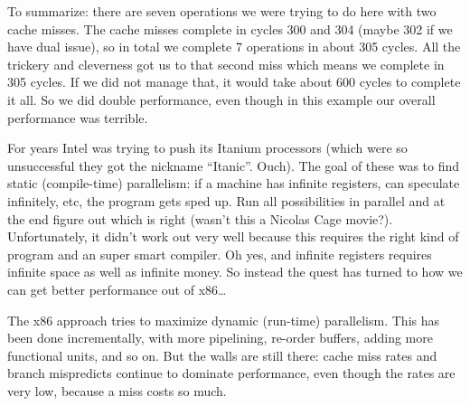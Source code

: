 
To summarize: there are seven operations we were trying to do here with two cache misses. The cache misses complete in cycles 300 and 304 (maybe 302 if we have dual issue), so in total we complete 7 operations in about 305 cycles. All the trickery and cleverness got us to that second miss which means we complete in 305 cycles. If we did not manage that, it would take about 600 cycles to complete it all. So we did double performance, even though in this example our overall performance was terrible.
 
For years Intel was trying to push its Itanium processors (which were so unsuccessful they got the nickname ``Itanic''. Ouch). The goal of these was to find static (compile-time) parallelism: if a machine has infinite registers, can speculate infinitely, etc, the program gets sped up. Run all possibilities in parallel and at the end figure out which is right (wasn't this a Nicolas Cage movie?). Unfortunately, it didn't work out very well because this requires the right kind of program and an super smart compiler. Oh yes, and infinite registers requires infinite space as well as infinite money. So instead the quest has turned to how we can get better performance out of x86\ldots

The x86 approach tries to maximize dynamic (run-time) parallelism. This has been done incrementally, with more pipelining, re-order buffers, adding more functional units, and so on. But the walls are still there: cache miss rates and branch mispredicts continue to dominate performance, even though the rates are very low, because a miss costs so much. 

